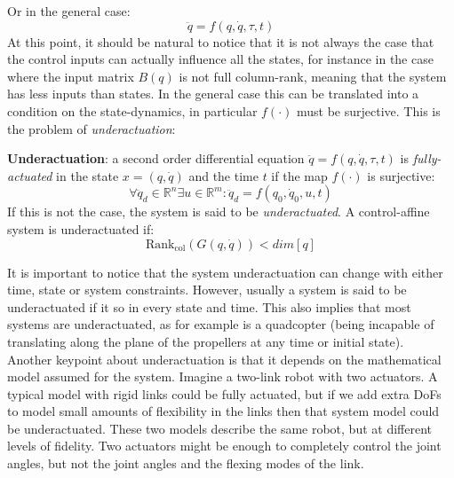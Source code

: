             Or in the general case:
            \[\ddot{q}=f(q,\dot{q},\tau,t)\]
            At this point, it should be natural to notice that it is not always the case that the control inputs can actually influence all the states, for instance in the case where the input matrix $B(q)$ is not full column-rank, meaning that the system has less inputs than states. In the general case this can be translated into a condition on the state-dynamics, in particular $f(\cdot)$ must be surjective. This is the problem of \textit{underactuation}:
            \begin{definition}
                \textbf{Underactuation}: a second order differential equation $\ddot{q}=f(q,\dot{q},\tau, t)$ is \textit{fully-actuated} in the state $x=(q,\dot{q})$ and the time $t$ if the map $f(\cdot)$ is surjective: 
                \[\forall \ddot{q}_{d}\in \mathbb{R}^{n} \exists u \in \mathbb{R}^{m}:\ddot{q}_d=f(q_0,\dot{q}_0,u,t)\]
                If this is not the case, the system is said to be \textit{underactuated}. A control-affine system is underactuated if:
                \[\text{Rank}_{\text{col}}(G(q,\dot{q}))<dim[q]\]
            \end{definition}
            It is important to notice that the system underactuation can change with either time, state or system constraints. However, usually a system is said to be underactuated if it so in every state and time. This also implies that most systems are underactuated, as for example is a quadcopter (being incapable of translating along the plane of the propellers at any time or initial state). \\
            Another keypoint about underactuation is that it depends on the mathematical model assumed for the system.  Imagine a two-link robot with two actuators. A typical model with rigid links could be fully actuated, but if we add extra DoFs to model small amounts of flexibility in the links then that system model could be underactuated. These two models describe the same robot, but at different levels of fidelity. Two actuators might be enough to completely control the joint angles, but not the joint angles and the flexing modes of the link. 
